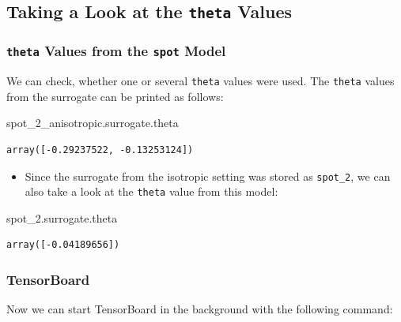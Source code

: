 \documentclass[
  letterpaper,
  DIV=11,
  numbers=noendperiod]{scrreprt}
\newenvironment{Shaded}{\begin{snugshade}}{\end{snugshade}}
\newcommand{\NormalTok}[1]{\textcolor[rgb]{0.00,0.23,0.31}{#1}}
\providecommand{\tightlist}{%
  \setlength{\itemsep}{0pt}\setlength{\parskip}{0pt}}\usepackage{longtable,booktabs,array}
\begin{document}
\subsection{\texorpdfstring{Taking a Look at the \texttt{theta}
Values}{Taking a Look at the theta Values}}\label{taking-a-look-at-the-theta-values}

\subsubsection{\texorpdfstring{\texttt{theta} Values from the
\texttt{spot}
Model}{theta Values from the spot Model}}\label{theta-values-from-the-spot-model}

We can check, whether one or several \texttt{theta} values were used.
The \texttt{theta} values from the surrogate can be printed as follows:

\begin{Shaded}
\begin{Highlighting}[]
\NormalTok{spot\_2\_anisotropic.surrogate.theta}
\end{Highlighting}
\end{Shaded}

\begin{verbatim}
array([-0.29237522, -0.13253124])
\end{verbatim}

\begin{itemize}
\tightlist
\item
  Since the surrogate from the isotropic setting was stored as
  \texttt{spot\_2}, we can also take a look at the \texttt{theta} value
  from this model:
\end{itemize}

\begin{Shaded}
\begin{Highlighting}[]
\NormalTok{spot\_2.surrogate.theta}
\end{Highlighting}
\end{Shaded}

\begin{verbatim}
array([-0.04189656])
\end{verbatim}

\subsubsection{TensorBoard}\label{tensorboard-4}

Now we can start TensorBoard in the background with the following
command:
\end{document}
